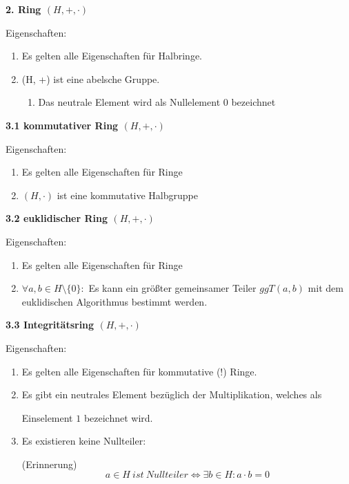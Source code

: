 \documentclass[18pt] {article}
\begin{document}
\pagebreak
\textbf{2. Ring $(H, +, \cdot)$}
\begin{framed}
Eigenschaften: \\

\begin{enumerate}
\item Es gelten alle Eigenschaften für Halbringe.

\item (H, +) ist eine abelsche Gruppe.
\begin{enumerate}
\item Das neutrale Element wird als Nullelement $0$ bezeichnet
\end{enumerate}
\end{enumerate}
\end{framed} 
\bigskip


\textbf{3.1 kommutativer Ring $(H, +, \cdot)$}
\begin{framed}
Eigenschaften: \\

\begin{enumerate}
\item Es gelten alle Eigenschaften für Ringe

\item $(H, \cdot )$ ist eine kommutative Halbgruppe
\end{enumerate}

\end{framed} 
\bigskip
\textbf{3.2 euklidischer Ring $(H, +, \cdot)$}
\begin{framed}
Eigenschaften: \\

\begin{enumerate}

\item Es gelten alle Eigenschaften für Ringe

\item $\forall a, b \in H\setminus\{0\}:$ Es kann ein größter gemeinsamer Teiler $ggT(a, b)$ mit dem euklidischen Algorithmus bestimmt werden.
\end{enumerate}
\end{framed}
\pagebreak
\textbf{3.3 Integritätsring $(H, +, \cdot)$}
\begin{framed}
Eigenschaften: \\
\begin{enumerate}
\item Es gelten alle Eigenschaften für kommutative (!) Ringe.

\item Es gibt ein neutrales Element bezüglich der Multiplikation, welches als 

Einselement $1$ bezeichnet wird.

\item Es existieren keine Nullteiler:

(Erinnerung)$$ a \in H \ ist \ Nullteiler \Leftrightarrow \exists b \in H : a \cdot b = 0$$
\end{enumerate}
\end{framed}  
\end{document}
